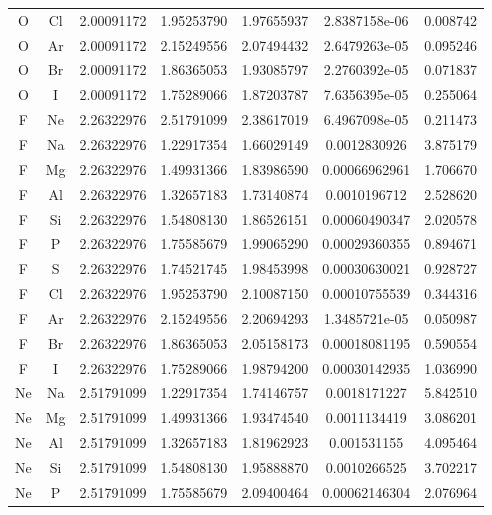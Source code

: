 \begin{longtable}{@{}ccccccc@{}}
O  &  Cl    &     2.00091172   &   1.95253790  &    1.97655937 &  2.8387158e-06  &  0.008742\\
O  &  Ar    &     2.00091172   &   2.15249556  &    2.07494432 &  2.6479263e-05  &  0.095246\\
O  &  Br    &     2.00091172   &   1.86365053  &    1.93085797 &  2.2760392e-05  &  0.071837\\
O  &  I     &     2.00091172   &   1.75289066  &    1.87203787 &  7.6356395e-05  &  0.255064\\
F  &  Ne    &     2.26322976   &   2.51791099  &    2.38617019 &  6.4967098e-05  &  0.211473\\
F  &  Na    &     2.26322976   &   1.22917354  &    1.66029149 &   0.0012830926  &  3.875179\\
F  &  Mg    &     2.26322976   &   1.49931366  &    1.83986590 &  0.00066962961  &  1.706670\\
F  &  Al    &     2.26322976   &   1.32657183  &    1.73140874 &   0.0010196712  &  2.528620\\
F  &  Si    &     2.26322976   &   1.54808130  &    1.86526151 &  0.00060490347  &  2.020578\\
F  &  P     &     2.26322976   &   1.75585679  &    1.99065290 &  0.00029360355  &  0.894671\\
F  &  S     &     2.26322976   &   1.74521745  &    1.98453998 &  0.00030630021  &  0.928727\\
F  &  Cl    &     2.26322976   &   1.95253790  &    2.10087150 &  0.00010755539  &  0.344316\\
F  &  Ar    &     2.26322976   &   2.15249556  &    2.20694293 &  1.3485721e-05  &  0.050987\\
F  &  Br    &     2.26322976   &   1.86365053  &    2.05158173 &  0.00018081195  &  0.590554\\
F  &  I     &     2.26322976   &   1.75289066  &    1.98794200 &  0.00030142935  &  1.036990\\
Ne &  Na    &     2.51791099   &   1.22917354  &    1.74146757 &   0.0018171227  &  5.842510\\
Ne &  Mg    &     2.51791099   &   1.49931366  &    1.93474540 &   0.0011134419  &  3.086201\\
Ne &  Al    &     2.51791099   &   1.32657183  &    1.81962923 &    0.001531155  &  4.095464\\
Ne &  Si    &     2.51791099   &   1.54808130  &    1.95888870 &   0.0010266525  &  3.702217\\
Ne &  P     &     2.51791099   &   1.75585679  &    2.09400464 &  0.00062146304  &  2.076964\\

\end{longtable}
